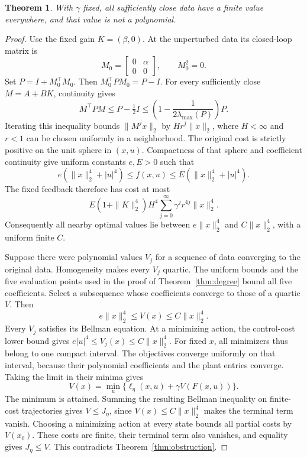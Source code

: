 \documentclass[10pt]{article}
\newtheorem{theorem}{Theorem}
\begin{document}
\begin{theorem}
With $\gamma$ fixed, all sufficiently close data have a finite value everywhere, and that value is not a polynomial.
\label{thm:perturbation}
\end{theorem}
\begin{proof}
Use the fixed gain $K=(\beta,0)$. At the unperturbed data its closed-loop matrix is
\[
 M_0=\begin{bmatrix}0&\alpha\\0&0\end{bmatrix},\qquad M_0^2=0.
\]
Set $P=I+M_0^\top M_0$. Then $M_0^\top PM_0=P-I$. For every sufficiently close $M=A+BK$, continuity gives
\[
 M^\top PM\leq P-\tfrac12I
 \leq\left(1-\frac{1}{2\lambda_{\max}(P)}\right)P.
\]
Iterating this inequality bounds $\|M^jx\|_2$ by $H r^j\|x\|_2$, where $H<\infty$ and $r<1$ can be chosen uniformly in a neighborhood. The original cost is strictly positive on the unit sphere in $(x,u)$. Compactness of that sphere and coefficient continuity give uniform constants $e,E>0$ such that
\[
 e(\|x\|_2^4+|u|^4)\leq f(x,u)
 \leq E(\|x\|_2^4+|u|^4).
\]
The fixed feedback therefore has cost at most
\[
 E(1+\|K\|_2^4)H^4\sum_{j=0}^\infty\gamma^jr^{4j}\|x\|_2^4.
\]
Consequently all nearby optimal values lie between $e\|x\|_2^4$ and $C\|x\|_2^4$, with a uniform finite $C$.

Suppose there were polynomial values $V_j$ for a sequence of data converging to the original data. Homogeneity makes every $V_j$ quartic. The uniform bounds and the five evaluation points used in the proof of Theorem~\ref{thm:degree} bound all five coefficients. Select a subsequence whose coefficients converge to those of a quartic $V$. Then
\[
 e\|x\|_2^4\leq V(x)\leq C\|x\|_2^4.
\]
Every $V_j$ satisfies its Bellman equation. At a minimizing action, the control-cost lower bound gives $e|u|^4\leq V_j(x)\leq C\|x\|_2^4$. For fixed $x$, all minimizers thus belong to one compact interval. The objectives converge uniformly on that interval, because their polynomial coefficients and the plant entries converge. Taking the limit in their minima gives
\[
 V(x)=\min_u\{\ell_\eta(x,u)+\gamma V(F(x,u))\}.
\]
The minimum is attained. Summing the resulting Bellman inequality on finite-cost trajectories gives $V\leq J_\eta$, since $V(x)\leq C\|x\|_2^4$ makes the terminal term vanish. Choosing a minimizing action at every state bounds all partial costs by $V(x_0)$. These costs are finite, their terminal term also vanishes, and equality gives $J_\eta\leq V$. This contradicts Theorem~\ref{thm:obstruction}.
\end{proof}
\end{document}

